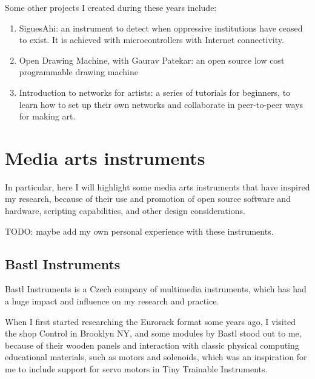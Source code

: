 Some other projects I created during these years include:

\begin{enumerate}
  \item SiguesAhi: an instrument to detect when oppressive institutions have ceased to exist. It is achieved with microcontrollers with Internet connectivity.
  \item Open Drawing Machine, with Gaurav Patekar: an open source low cost programmable drawing machine
  \item Introduction to networks for artists: a series of tutorials for beginners, to learn how to set up their own networks and collaborate in peer-to-peer ways for making art.
\end{enumerate}

\section{Media arts instruments}

In particular, here I will highlight some media arts instruments that have inspired my research, because of their use and promotion of open source software and hardware, scripting capabilities, and other design considerations.

TODO: maybe add my own personal experience with these instruments.

\subsection{Bastl Instruments}

Bastl Instruments is a Czech company of multimedia instruments, which has had a huge impact and influence on my research and practice.

When I first started researching the Eurorack format some years ago, I visited the shop Control in Brooklyn NY, and some modules by Bastl stood out to me, because of their wooden panels and interaction with classic physical computing educational materials, such as motors and solenoids, which was an inspiration for me to include support for servo motors in Tiny Trainable Instruments.

